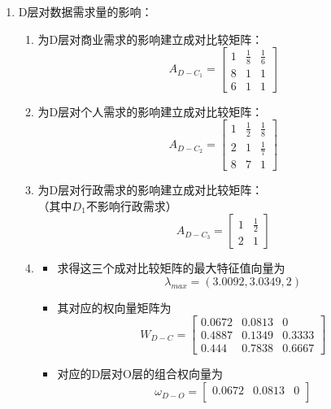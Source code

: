 \documentclass[UTF8,12pt]{ctexart}
\begin{document}
\begin{enumerate}
    \item D层对数据需求量的影响：
          \begin{enumerate}
              \item 为D层对商业需求的影响建立成对比较矩阵：
                    $$A_{D-C_1}=\begin{bmatrix}
                            1 & \frac{1}{8} & \frac{1}{6} \\
                            8 & 1           & 1           \\
                            6 & 1           & 1
                        \end{bmatrix}$$
              \item 为D层对个人需求的影响建立成对比较矩阵：
                    $$A_{D-C_2}=\begin{bmatrix}
                            1 & \frac{1}{2} & \frac{1}{8} \\
                            2 & 1           & \frac{1}{7} \\
                            8 & 7           & 1
                        \end{bmatrix}$$
              \item 为D层对行政需求的影响建立成对比较矩阵：\\（其中$D_1$不影响行政需求）
                    $$A_{D-C_3}=\begin{bmatrix}
                            1 & \frac{1}{2} \\
                            2 & 1
                        \end{bmatrix}$$
              \item \begin{itemize}
                        \item 求得这三个成对比较矩阵的最大特征值向量为$$\lambda _{max}=(3.0092,3.0349,2)$$
                        \item 其对应的权向量矩阵为$$W_{D-C}=\begin{bmatrix}
                                      0.0672 & 0.0813 & 0      \\
                                      0.4887 & 0.1349 & 0.3333 \\
                                      0.444  & 0.7838 & 0.6667
                                  \end{bmatrix}$$
                        \item 对应的D层对O层的组合权向量为$$\omega_{D-O}=\begin{bmatrix}
                                      0.0672 & 0.0813 & 0      \\

\end{bmatrix}$$
\end{itemize}
\end{enumerate}
\end{enumerate}
\end{document}
